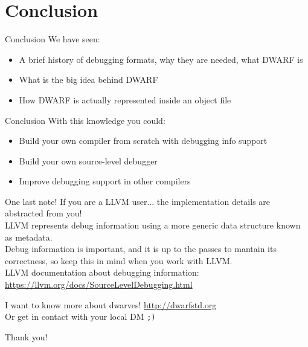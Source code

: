 
\section{Conclusion}


\begin{frame}{Conclusion}
We have seen:
\begin{itemize}
\item A brief history of debugging formats, why they are needed, what DWARF is
\item What is the big idea behind DWARF
\item How DWARF is actually represented inside an object file
\end{itemize}
\end{frame}


\begin{frame}{Conclusion}
With this knowledge you could:

\begin{itemize}
\item Build your own compiler from scratch with debugging info support
\item Build your own source-level debugger
\item Improve debugging support in other compilers
\end{itemize}
\end{frame}


\begin{frame}{One last note!}
If you are a LLVM user... the implementation details are \alert{abstracted} from you!\\
\medskip
LLVM represents debug information using a more generic data structure known
as \alert{metadata}.\\
\medskip
Debug information is important, and it is \alert{up to the passes} to mantain its
correctness, so keep this in mind when you work with LLVM.\\
\bigskip
LLVM documentation about debugging information: \url{https://llvm.org/docs/SourceLevelDebugging.html}
\end{frame}


\begin{frame}{I want to know more about dwarves!}
\Large
\centering
\vfill
\url{http://dwarfstd.org}\\
\vfill
\scriptsize
Or get in contact with your local DM \texttt{;)}
\end{frame}


\begin{frame}{}
\begin{center}
\Huge
Thank you!
\end{center}
\end{frame}


